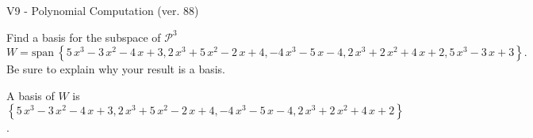 \begin{exercise}
  \begin{exerciseTitle}V9 - Polynomial Computation (ver. 88)\end{exerciseTitle}
  \begin{exerciseStatement}
    Find a basis for the subspace of \(\mathcal{P}^3\) 
\[W=\mathrm{span}\ \left\{5 \, x^{3} - 3 \, x^{2} - 4 \, x + 3 , 2 \, x^{3} + 5 \, x^{2} - 2 \, x + 4 , -4 \, x^{3} - 5 \, x - 4 , 2 \, x^{3} + 2 \, x^{2} + 4 \, x + 2 , 5 \, x^{3} - 3 \, x + 3\right\}.\]
 Be sure to explain why your result is a basis.


  \end{exerciseStatement}
  \begin{exerciseAnswer}
   A basis of \(W\) is  \(\left\{5 \, x^{3} - 3 \, x^{2} - 4 \, x + 3 , 2 \, x^{3} + 5 \, x^{2} - 2 \, x + 4 , -4 \, x^{3} - 5 \, x - 4 , 2 \, x^{3} + 2 \, x^{2} + 4 \, x + 2\right\}\).
  


  \end{exerciseAnswer}
\end{exercise}